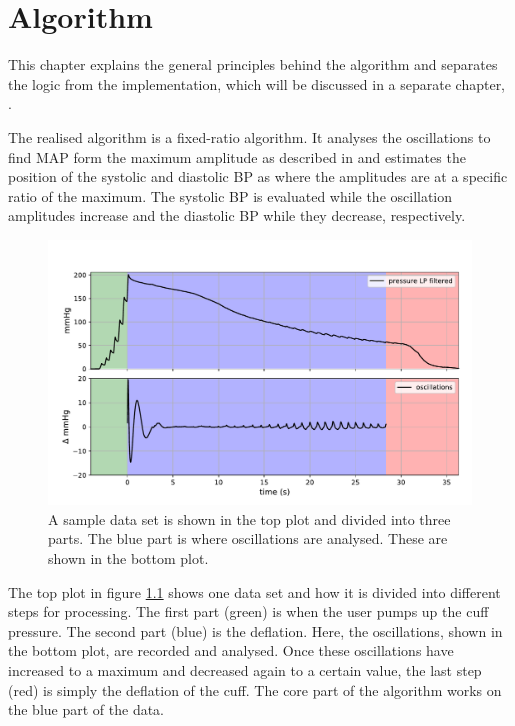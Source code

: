 \chapter{Algorithm}\label{cp:algo}

This chapter explains the general principles behind the algorithm and separates the logic from the implementation, which will be discussed in a separate chapter, . 

The realised algorithm is a fixed-ratio algorithm. It analyses the oscillations to find MAP form the maximum amplitude as described in  and estimates the position of the systolic and diastolic BP as where the amplitudes are at a specific ratio of the maximum. The systolic BP is evaluated while the oscillation amplitudes increase and the diastolic BP while they decrease, respectively.


\begin{figure}[ht]
\centering
\includegraphics[width=\textwidth]{figures/algo_overview.pdf}
\caption{A sample data set is shown in the top plot and divided into three parts. The blue part is where oscillations are analysed. These are shown in the bottom plot.}
\label{fig:algoOverview}
\end{figure}

The top plot in figure \ref{fig:algoOverview} shows one data set and how it is divided into different steps for processing. The first part (green) is when the user pumps up the cuff pressure. The second part (blue) is the deflation. Here, the oscillations, shown in the bottom plot, are recorded and analysed. Once these oscillations have increased to a maximum and decreased again to a certain value, the last step (red) is simply the deflation of the cuff. The core part of the algorithm works on the blue part of the data.




